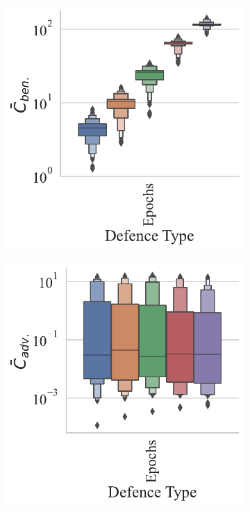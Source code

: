 \begin{figure}[h!]
    \centering
    \begin{subfigure}[]{.3\textwidth}
        \centering
        \includegraphics[width=\textwidth]{cifar100/ben_failures_per_train_time_vs_defence_type.pdf}
    \end{subfigure}
    \begin{subfigure}[]{0.3\textwidth}
        \includegraphics[width=\textwidth]{cifar100/adv_failures_per_train_time_vs_defence_type.pdf}

\end{subfigure}
\end{figure}
